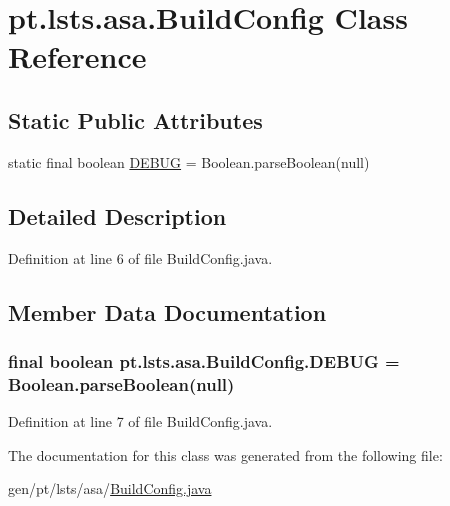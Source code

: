 \hypertarget{classpt_1_1lsts_1_1asa_1_1BuildConfig}{}\section{pt.\+lsts.\+asa.\+Build\+Config Class Reference}
\label{classpt_1_1lsts_1_1asa_1_1BuildConfig}
\subsection*{Static Public Attributes}
\begin{DoxyCompactItemize}
\item 
static final boolean \hyperlink{classpt_1_1lsts_1_1asa_1_1BuildConfig_a6a957c8a6cc373f469c1a7b434a01791}{D\+E\+B\+U\+G} = Boolean.\+parse\+Boolean(null)
\end{DoxyCompactItemize}


\subsection{Detailed Description}


Definition at line 6 of file Build\+Config.\+java.



\subsection{Member Data Documentation}
\hypertarget{classpt_1_1lsts_1_1asa_1_1BuildConfig_a6a957c8a6cc373f469c1a7b434a01791}{}
\subsubsection[{D\+E\+B\+U\+G}]{\setlength{\rightskip}{0pt plus 5cm}final boolean pt.\+lsts.\+asa.\+Build\+Config.\+D\+E\+B\+U\+G = Boolean.\+parse\+Boolean(null)\hspace{0.3cm}{\ttfamily [static]}}\label{classpt_1_1lsts_1_1asa_1_1BuildConfig_a6a957c8a6cc373f469c1a7b434a01791}


Definition at line 7 of file Build\+Config.\+java.



The documentation for this class was generated from the following file\+:\begin{DoxyCompactItemize}
\item 
gen/pt/lsts/asa/\hyperlink{BuildConfig_8java}{Build\+Config.\+java}\end{DoxyCompactItemize}
